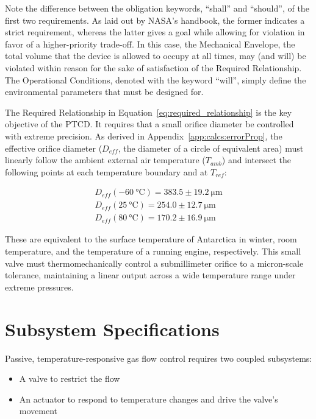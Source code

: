 \documentclass[12pt, letterpaper]{report}%
\newcounter{mycounter}           %
\newcounter{sub}[mycounter]      %
\newcommand{\Dcold}{D_{eff}(\SI{-60}{\celsius}) = 383.5 \pm \SI{19.2}{\micro\meter}}
\newcommand{\Dhot}{D_{eff}(\SI{80}{\celsius}) = 170.2 \pm \SI{16.9}{\micro\meter}}
\newcommand{\Dref}{D_{eff}(\SI{25}{\celsius}) = 254.0 \pm \SI{12.7}{\micro\meter}}
\begin{document}
		Note the difference between the obligation keywords, ``shall'' and ``should'', of the first two requirements.
		As laid out by NASA's handbook, the former indicates a strict requirement, whereas the latter gives a goal while allowing for violation in favor of a higher-priority trade-off.
		In this case, the Mechanical Envelope, the total volume that the device is allowed to occupy at all times, may (and will) be violated within reason for the sake of satisfaction of the Required Relationship.
		The Operational Conditions, denoted with the keyword ``will'', simply define the environmental parameters that must be designed for.

		The Required Relationship in Equation~\eqref{eq:required_relationship} is the key objective of the PTCD. It requires that a small orifice diameter be controlled with extreme precision.
		As derived in Appendix~\ref{app:calcs:errorProp}, the effective orifice diameter ($D_{eff}$, the diameter of a circle of equivalent area)
		must linearly follow the ambient external air temperature ($T_{amb}$) and intersect the following points at each temperature boundary and at $T_{ref}$:

		\begin{align}
			\Dcold \label{eq:coldBoundary} \\
			\Dref \label{eq:DTref} \\
			\Dhot \label{eq:hotBoundary}
		\end{align}

		These are equivalent to the surface temperature of Antarctica in winter, room temperature, and the temperature of a running engine, respectively.
		This small valve must thermomechanically control a submillimeter orifice to a micron-scale tolerance, maintaining a linear output across a wide temperature range under extreme pressures.
		

	\section{Subsystem Specifications}
	\label{sec:intro:specs}
		
		Passive, temperature-responsive gas flow control requires two coupled subsystems:

		\begin{itemize}
			\item A valve to restrict the flow
			\item An actuator to respond to temperature changes and drive the valve's movement
		\end{itemize}
\end{document}
